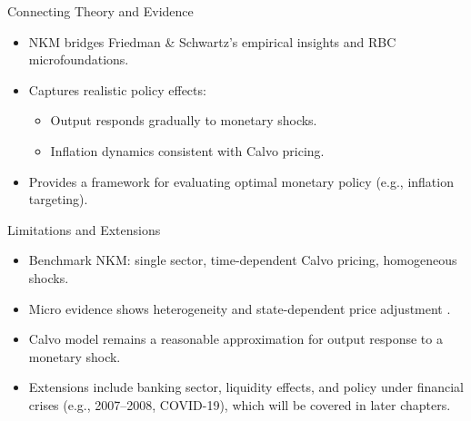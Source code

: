 \documentclass[11pt,aspectratio=169]{beamer}
\begin{document}
\begin{frame}{Connecting Theory and Evidence}
\small

\begin{itemize}
  \item NKM bridges Friedman \& Schwartz’s empirical insights and RBC microfoundations.
  \item Captures realistic policy effects:
    \begin{itemize}
      \item Output responds gradually to monetary shocks.
      \item Inflation dynamics consistent with Calvo pricing.
    \end{itemize}
  \item Provides a framework for evaluating optimal monetary policy (e.g., inflation targeting).
\end{itemize}
\end{frame}

\begin{frame}{Limitations and Extensions}
\small

\begin{itemize}
  \item Benchmark NKM: single sector, time-dependent Calvo pricing, homogeneous shocks.
  \item Micro evidence shows heterogeneity and state-dependent price adjustment \parencite{nakamura2008, nakamura2013}.
  \item Calvo model remains a reasonable approximation for output response to a monetary shock.
  \item Extensions include banking sector, liquidity effects, and policy under financial crises (e.g., 2007–2008, COVID-19), which will be covered in later chapters.
\end{itemize}
\end{frame}
\end{document}
